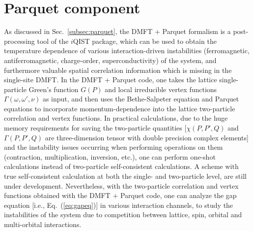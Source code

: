 \section{Parquet component}
As discussed in Sec.~\ref{subsec:parquet}, the DMFT + Parquet formalism is a post-processing tool of the $i$QIST package, which can be used to obtain the temperature dependence of various interaction-driven instabilities (ferromagnetic, antiferromagnetic, charge-order, superconductivity) of the system, and furthermore valuable spatial correlation information which is missing in the single-site DMFT. In the DMFT + Parquet code, one takes the lattice single-particle Green's function $G(P)$ and local irreducible vertex functions $\Gamma(\omega,\omega',\nu)$ as input, and then uses the Bethe-Salpeter equation and Parquet equations to incorporate momentum-dependence into the lattice two-particle correlation and vertex functions. In practical calculations, due to the huge memory requirements for saving the two-particle quantities [$\chi(P,P',Q)$ and $\Gamma(P,P',Q)$ are three-dimension tensor with double precision complex elements] and the instability issues occurring when performing operations on them (contraction, multiplication, inversion, etc.), one can perform one-shot calculations instead of two-particle self-consistent calculations. A scheme with true self-consistent calculation at both the single- and two-particle level, are still under development. Nevertheless, with the two-particle correlation and vertex functions obtained with the DMFT + Parquet code, one can  analyze the gap equation [i.e., Eq.~(\ref{eq:gapeq})] in various interaction channels, to study the instabilities of the system due to competition between lattice, spin, orbital and multi-orbital interactions.
